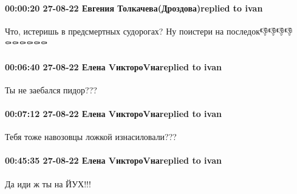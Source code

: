  
 
 
 
 

\paragraph{00:00:20 27-08-22 Евгения Толкачева(Дроздова)replied to ivan}

Что, истеришь в предсмертных судорогах? Ну поистери на последок👎👎👎👎⚰️⚰️⚰️⚰️⚰️⚰️

\paragraph{00:06:40 27-08-22 Елена VиктороVнаreplied to ivan}
Ты не заебался пидор???

\paragraph{00:07:12 27-08-22 Елена VиктороVнаreplied to ivan}
Тебя тоже навозовцы ложкой изнасиловали???

\paragraph{00:45:35 27-08-22 Елена VиктороVнаreplied to ivan}

Да иди ж ты на ЙУХ!!!
